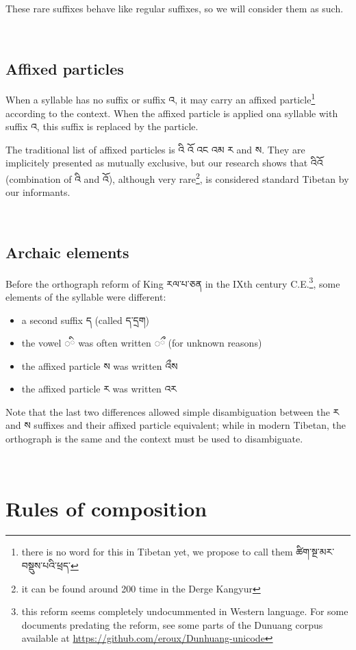 \documentclass[%
a4paper,%
pagesize,%
12pt,%
parskip=off,%
bibliography=totoc,%
numbers=noenddot,%
DIV=12,%
twoside=semi,%
headings=normal%
]{scrartcl}
\begin{document}
These rare suffixes behave like regular suffixes, so we will consider them as such.

­\subsection{Affixed particles}

When a syllable has no suffix or suffix འ, it may carry an affixed particle\footnote{there is no word for this in Tibetan yet, we propose to call them ཚིག་སྔ་མར་བསྡུས་པའི་ཕྲད་} according to the context. When the affixed particle is applied ona syllable with suffix འ, this suffix is replaced by the particle.

The traditional list of affixed particles is འི འོ འང འམ ར and ས. They are implicitely presented as mutually exclusive, but our research shows that འིའོ (combination of འི and འོ), although very rare\footnote{it can be found around 200 time in the Derge Kangyur}, is considered standard Tibetan by our informants.

­\subsection{Archaic elements}

Before the orthograph reform of King རལ་པ་ཅན in the \textsc{IX}th century \textsc{C.E.}\footnote{this reform seems completely undocummented in Western language. For some documents predating the reform, see some parts of the Dunuang corpus available at \url{https://github.com/eroux/Dunhuang-unicode}}, some elements of the syllable were different:

\begin{itemize}
\item a second suffix ད (called ད་དྲག)
\item the vowel {\tibetanfont ◌}ི was often written {\tibetanfont ◌}ྀ (for unknown reasons)
\item the affixed particle ས was written འྀས
\item the affixed particle ར was written འར
\end{itemize}

Note that the last two differences allowed simple disambiguation between the ར and ས suffixes and their affixed particle equivalent; while in modern Tibetan, the orthograph is the same and the context must be used to disambiguate.

­\section{Rules of composition}
\end{document}
